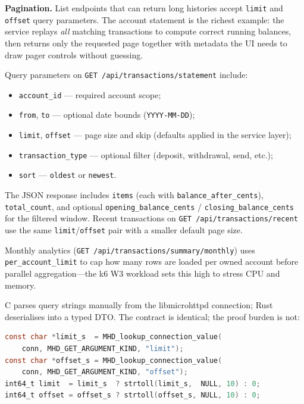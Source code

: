 \par \textbf{Pagination.} List endpoints that can return long histories accept 
\texttt{limit} and \texttt{offset} query parameters. The account statement is the 
richest example: the service replays \emph{all} matching transactions to compute 
correct running balances, then returns only the requested page together with metadata 
the UI needs to draw pager controls without guessing.

\par Query parameters on \texttt{GET /api/transactions/statement} include:
\begin{itemize}
  \item \texttt{account\_id} --- required account scope;
  \item \texttt{from}, \texttt{to} --- optional date bounds (\texttt{YYYY-MM-DD});
  \item \texttt{limit}, \texttt{offset} --- page size and skip (defaults applied in the service layer);
  \item \texttt{transaction\_type} --- optional filter (deposit, withdrawal, send, etc.);
  \item \texttt{sort} --- \texttt{oldest} or \texttt{newest}.
\end{itemize}

\par The JSON response includes \texttt{items} (each with \texttt{balance\_after\_cents}), 
\texttt{total\_count}, and optional \texttt{opening\_balance\_cents} / 
\texttt{closing\_balance\_cents} for the filtered window. Recent transactions on 
\texttt{GET /api/transactions/recent} use the same \texttt{limit}/\texttt{offset} pair 
with a smaller default page size.

\par Monthly analytics (\texttt{GET /api/transactions/summary/monthly}) uses 
\texttt{per\_account\_limit} to cap how many rows are loaded per owned account before 
parallel aggregation---the k6 W3 workload sets this high to stress CPU and memory.

\par C parses query strings manually from the libmicrohttpd connection; Rust deserialises 
into a typed DTO. The contract is identical; the proof burden is not:

\begin{lstlisting}[language=C, caption={http\_transactions.c --- Statement pagination
parameters are read as strings and converted to integers.}]
const char *limit_s  = MHD_lookup_connection_value(
    conn, MHD_GET_ARGUMENT_KIND, "limit");
const char *offset_s = MHD_lookup_connection_value(
    conn, MHD_GET_ARGUMENT_KIND, "offset");
int64_t limit  = limit_s  ? strtoll(limit_s,  NULL, 10) : 0;
int64_t offset = offset_s ? strtoll(offset_s, NULL, 10) : 0;
\end{lstlisting}

